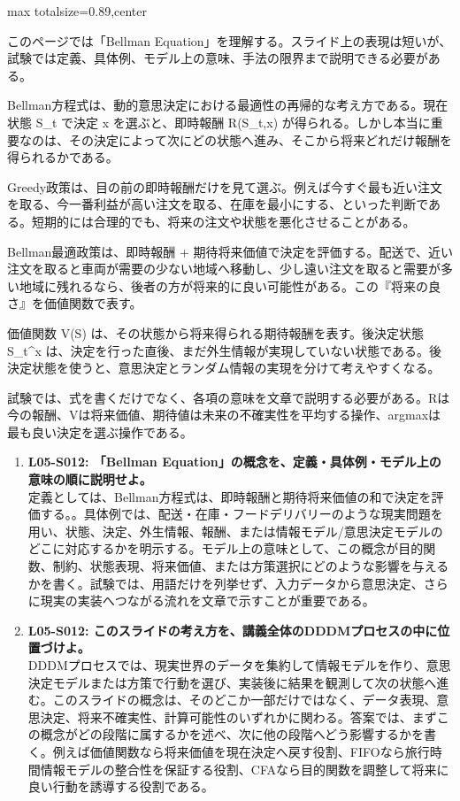 \begin{minipage}[t]{0.58\textwidth}
\begin{adjustbox}{max totalsize={\textwidth}{0.89\textheight},center}
\begin{minipage}{\textwidth}\scriptsize
{}このページでは「Bellman Equation」を理解する。スライド上の表現は短いが、試験では定義、具体例、モデル上の意味、手法の限界まで説明できる必要がある。\par
Bellman方程式は、動的意思決定における最適性の再帰的な考え方である。現在状態 S\_t で決定 x を選ぶと、即時報酬 R(S\_t,x) が得られる。しかし本当に重要なのは、その決定によって次にどの状態へ進み、そこから将来どれだけ報酬を得られるかである。\par
Greedy政策は、目の前の即時報酬だけを見て選ぶ。例えば今すぐ最も近い注文を取る、今一番利益が高い注文を取る、在庫を最小にする、といった判断である。短期的には合理的でも、将来の注文や状態を悪化させることがある。\par
Bellman最適政策は、即時報酬 + 期待将来価値で決定を評価する。配送で、近い注文を取ると車両が需要の少ない地域へ移動し、少し遠い注文を取ると需要が多い地域に残れるなら、後者の方が将来的に良い可能性がある。この『将来の良さ』を価値関数で表す。\par
価値関数 V(S) は、その状態から将来得られる期待報酬を表す。後決定状態 S\_t\textasciicircum{}x は、決定を行った直後、まだ外生情報が実現していない状態である。後決定状態を使うと、意思決定とランダム情報の実現を分けて考えやすくなる。\par
試験では、式を書くだけでなく、各項の意味を文章で説明する必要がある。Rは今の報酬、Vは将来価値、期待値は未来の不確実性を平均する操作、argmaxは最も良い決定を選ぶ操作である。\par{}\begin{enumerate}\item \textbf{L05-S012: 「Bellman Equation」の概念を、定義・具体例・モデル上の意味の順に説明せよ。}\\定義としては、Bellman方程式は、即時報酬と期待将来価値の和で決定を評価する。。具体例では、配送・在庫・フードデリバリーのような現実問題を用い、状態、決定、外生情報、報酬、または情報モデル/意思決定モデルのどこに対応するかを明示する。モデル上の意味として、この概念が目的関数、制約、状態表現、将来価値、または方策選択にどのような影響を与えるかを書く。試験では、用語だけを列挙せず、入力データから意思決定、さらに現実の実装へつながる流れを文章で示すことが重要である。\item \textbf{L05-S012: このスライドの考え方を、講義全体のDDDMプロセスの中に位置づけよ。}\\DDDMプロセスでは、現実世界のデータを集約して情報モデルを作り、意思決定モデルまたは方策で行動を選び、実装後に結果を観測して次の状態へ進む。このスライドの概念は、そのどこか一部だけではなく、データ表現、意思決定、将来不確実性、計算可能性のいずれかに関わる。答案では、まずこの概念がどの段階に属するかを述べ、次に他の段階へどう影響するかを書く。例えば価値関数なら将来価値を現在決定へ戻す役割、FIFOなら旅行時間情報モデルの整合性を保証する役割、CFAなら目的関数を調整して将来に良い行動を誘導する役割である。\end{enumerate}

\end{minipage}
\end{adjustbox}
\end{minipage}
